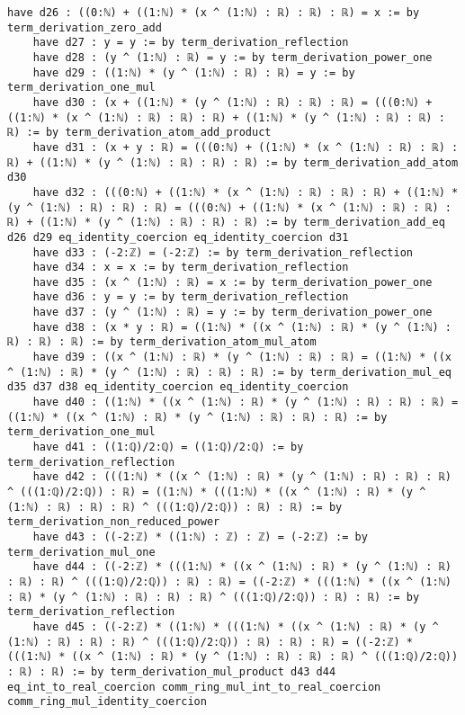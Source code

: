 \documentclass{article}
\begin{document}
\begin{tcolorbox}[colback=white!10, width=\linewidth]
\begin{lstlisting}[language=Lean4]
    have d26 : ((0:ℕ) + ((1:ℕ) * (x ^ (1:ℕ) : ℝ) : ℝ) : ℝ) = x := by term_derivation_zero_add
    have d27 : y = y := by term_derivation_reflection
    have d28 : (y ^ (1:ℕ) : ℝ) = y := by term_derivation_power_one
    have d29 : ((1:ℕ) * (y ^ (1:ℕ) : ℝ) : ℝ) = y := by term_derivation_one_mul
    have d30 : (x + ((1:ℕ) * (y ^ (1:ℕ) : ℝ) : ℝ) : ℝ) = (((0:ℕ) + ((1:ℕ) * (x ^ (1:ℕ) : ℝ) : ℝ) : ℝ) + ((1:ℕ) * (y ^ (1:ℕ) : ℝ) : ℝ) : ℝ) := by term_derivation_atom_add_product
    have d31 : (x + y : ℝ) = (((0:ℕ) + ((1:ℕ) * (x ^ (1:ℕ) : ℝ) : ℝ) : ℝ) + ((1:ℕ) * (y ^ (1:ℕ) : ℝ) : ℝ) : ℝ) := by term_derivation_add_atom d30
    have d32 : (((0:ℕ) + ((1:ℕ) * (x ^ (1:ℕ) : ℝ) : ℝ) : ℝ) + ((1:ℕ) * (y ^ (1:ℕ) : ℝ) : ℝ) : ℝ) = (((0:ℕ) + ((1:ℕ) * (x ^ (1:ℕ) : ℝ) : ℝ) : ℝ) + ((1:ℕ) * (y ^ (1:ℕ) : ℝ) : ℝ) : ℝ) := by term_derivation_add_eq d26 d29 eq_identity_coercion eq_identity_coercion d31
    have d33 : (-2:ℤ) = (-2:ℤ) := by term_derivation_reflection
    have d34 : x = x := by term_derivation_reflection
    have d35 : (x ^ (1:ℕ) : ℝ) = x := by term_derivation_power_one
    have d36 : y = y := by term_derivation_reflection
    have d37 : (y ^ (1:ℕ) : ℝ) = y := by term_derivation_power_one
    have d38 : (x * y : ℝ) = ((1:ℕ) * ((x ^ (1:ℕ) : ℝ) * (y ^ (1:ℕ) : ℝ) : ℝ) : ℝ) := by term_derivation_atom_mul_atom
    have d39 : ((x ^ (1:ℕ) : ℝ) * (y ^ (1:ℕ) : ℝ) : ℝ) = ((1:ℕ) * ((x ^ (1:ℕ) : ℝ) * (y ^ (1:ℕ) : ℝ) : ℝ) : ℝ) := by term_derivation_mul_eq d35 d37 d38 eq_identity_coercion eq_identity_coercion
    have d40 : ((1:ℕ) * ((x ^ (1:ℕ) : ℝ) * (y ^ (1:ℕ) : ℝ) : ℝ) : ℝ) = ((1:ℕ) * ((x ^ (1:ℕ) : ℝ) * (y ^ (1:ℕ) : ℝ) : ℝ) : ℝ) := by term_derivation_one_mul
    have d41 : ((1:ℚ)/2:ℚ) = ((1:ℚ)/2:ℚ) := by term_derivation_reflection
    have d42 : (((1:ℕ) * ((x ^ (1:ℕ) : ℝ) * (y ^ (1:ℕ) : ℝ) : ℝ) : ℝ) ^ (((1:ℚ)/2:ℚ)) : ℝ) = ((1:ℕ) * (((1:ℕ) * ((x ^ (1:ℕ) : ℝ) * (y ^ (1:ℕ) : ℝ) : ℝ) : ℝ) ^ (((1:ℚ)/2:ℚ)) : ℝ) : ℝ) := by term_derivation_non_reduced_power
    have d43 : ((-2:ℤ) * ((1:ℕ) : ℤ) : ℤ) = (-2:ℤ) := by term_derivation_mul_one
    have d44 : ((-2:ℤ) * (((1:ℕ) * ((x ^ (1:ℕ) : ℝ) * (y ^ (1:ℕ) : ℝ) : ℝ) : ℝ) ^ (((1:ℚ)/2:ℚ)) : ℝ) : ℝ) = ((-2:ℤ) * (((1:ℕ) * ((x ^ (1:ℕ) : ℝ) * (y ^ (1:ℕ) : ℝ) : ℝ) : ℝ) ^ (((1:ℚ)/2:ℚ)) : ℝ) : ℝ) := by term_derivation_reflection
    have d45 : ((-2:ℤ) * ((1:ℕ) * (((1:ℕ) * ((x ^ (1:ℕ) : ℝ) * (y ^ (1:ℕ) : ℝ) : ℝ) : ℝ) ^ (((1:ℚ)/2:ℚ)) : ℝ) : ℝ) : ℝ) = ((-2:ℤ) * (((1:ℕ) * ((x ^ (1:ℕ) : ℝ) * (y ^ (1:ℕ) : ℝ) : ℝ) : ℝ) ^ (((1:ℚ)/2:ℚ)) : ℝ) : ℝ) := by term_derivation_mul_product d43 d44 eq_int_to_real_coercion comm_ring_mul_int_to_real_coercion comm_ring_mul_identity_coercion

\end{lstlisting}
\end{tcolorbox}
\end{document}
